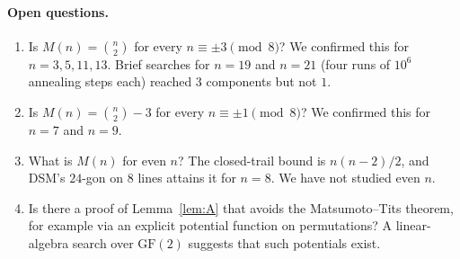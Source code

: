 \paragraph{Open questions.}
\begin{enumerate}
\item Is $M(n)=\binom n2$ for every $n\equiv\pm3\pmod 8$? We confirmed this for $n=3,5,11,13$. Brief
  searches for $n=19$ and $n=21$ (four runs of $10^6$ annealing steps each) reached $3$ components but
  not $1$.
\item Is $M(n)=\binom n2-3$ for every $n\equiv\pm1\pmod 8$? We confirmed this for $n=7$ and $n=9$.
\item What is $M(n)$ for even $n$? The closed-trail bound is $n(n-2)/2$, and DSM's $24$-gon on $8$
  lines attains it for $n=8$. We have not studied even $n$.
\item Is there a proof of Lemma~\ref{lem:A} that avoids the Matsumoto--Tits theorem, for example via an
  explicit potential function on permutations? A linear-algebra search over $\mathrm{GF}(2)$ suggests
  that such potentials exist.
\end{enumerate}
